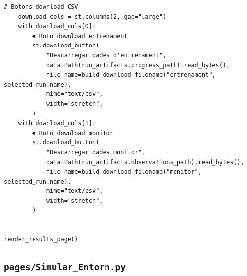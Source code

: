 \documentclass[10pt,a4paper]{article}
\begin{document}
\begin{lstlisting}[style=studioPython,caption={pages/Resultats.py},label={lst:pages-resultats-py}]
    # Botons download CSV
    download_cols = st.columns(2, gap="large")
    with download_cols[0]:
        # Botó download entrenament
        st.download_button(
            "Descarregar dades d'entrenament",
            data=Path(run_artifacts.progress_path).read_bytes(),
            file_name=build_download_filename("entrenament", selected_run.name),
            mime="text/csv",
            width="stretch",
        )
    with download_cols[1]:
        # Botó download monitor
        st.download_button(
            "Descarregar dades monitor",
            data=Path(run_artifacts.observations_path).read_bytes(),
            file_name=build_download_filename("monitor", selected_run.name),
            mime="text/csv",
            width="stretch",
        )


render_results_page()
\end{lstlisting}


\subsection{\texorpdfstring{\texttt{pages/Simular\_Entorn.py}}{pages/Simular\_Entorn.py}}
\end{document}
